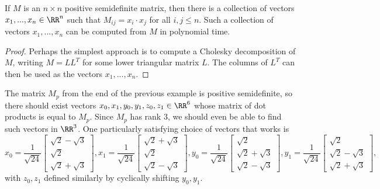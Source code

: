 \begin{prop} If $M$ is an $n\times n$ positive semidefinite matrix, then there is a collection of vectors $x_1, ..., x_n \in \RR^n$ such that $M_{ij} = x_i\cdot x_j$ for all $i,j \le n$. Such a collection of vectors $x_1, ..., x_n$ can be computed from $M$ in polynomial time.
\end{prop}
\begin{proof} Perhaps the simplest approach is to compute a Cholesky decomposition of $M$, writing $M = LL^T$ for some lower triangular matrix $L$. The columns of $L^T$ can then be used as the vectors $x_1, ..., x_n$.
\end{proof}

\begin{ex} The matrix $M_p$ from the end of the previous example is positive semidefinite, so there should exist vectors $x_0, x_1, y_0, y_1, z_0, z_1 \in \RR^6$ whose matrix of dot products is equal to $M_p$. Since $M_p$ has rank $3$, we should even be able to find such vectors in $\RR^3$. One particularly satisfying choice of vectors that works is
\[
x_0 = \frac{1}{\sqrt{24}}\begin{bmatrix}\sqrt{2} - \sqrt{3}\\ \sqrt{2}\\ \sqrt{2}+\sqrt{3}\end{bmatrix}, x_1 = \frac{1}{\sqrt{24}}\begin{bmatrix}\sqrt{2} + \sqrt{3}\\ \sqrt{2}\\ \sqrt{2}-\sqrt{3}\end{bmatrix}, y_0 = \frac{1}{\sqrt{24}}\begin{bmatrix}\sqrt{2}\\ \sqrt{2}+\sqrt{3}\\ \sqrt{2} - \sqrt{3}\end{bmatrix}, y_1 = \frac{1}{\sqrt{24}}\begin{bmatrix}\sqrt{2}\\ \sqrt{2}-\sqrt{3}\\ \sqrt{2} + \sqrt{3}\end{bmatrix}, 
\]
with $z_0, z_1$ defined similarly by cyclically shifting $y_0, y_1$.
\end{ex}


